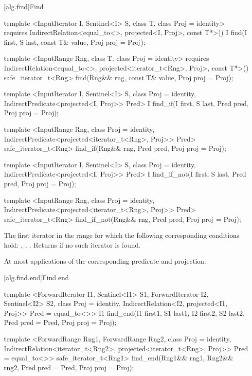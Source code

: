 [alg.find]{Find}

%
%
%
\begin{itemdecl}
template <InputIterator I, Sentinel<I> S, class T, class Proj = identity>
  requires IndirectRelation<equal_to<>, projected<I, Proj>, const T*>()
  I find(I first, S last, const T& value, Proj proj = Proj{});

template <InputRange Rng, class T, class Proj = identity>
  requires IndirectRelation<equal_to<>, projected<iterator_t<Rng>, Proj>, const T*>()
  safe_iterator_t<Rng>
    find(Rng&& rng, const T& value, Proj proj = Proj{});

template <InputIterator I, Sentinel<I> S, class Proj = identity,
    IndirectPredicate<projected<I, Proj>> Pred>
  I find_if(I first, S last, Pred pred, Proj proj = Proj{});

template <InputRange Rng, class Proj = identity,
    IndirectPredicate<projected<iterator_t<Rng>, Proj>> Pred>
  safe_iterator_t<Rng>
    find_if(Rng&& rng, Pred pred, Proj proj = Proj{});

template <InputIterator I, Sentinel<I> S, class Proj = identity,
    IndirectPredicate<projected<I, Proj>> Pred>
  I find_if_not(I first, S last, Pred pred, Proj proj = Proj{});

template <InputRange Rng, class Proj = identity,
    IndirectPredicate<projected<iterator_t<Rng>, Proj>> Pred>
  safe_iterator_t<Rng>
    find_if_not(Rng&& rng, Pred pred, Proj proj = Proj{});
\end{itemdecl}

\begin{itemdescr}
\pnum
\returns
The first iterator
in the range
for which the following corresponding
conditions hold:
,
,
.
Returns  if no such iterator is found.

\pnum
\complexity
At most
applications of the corresponding predicate and projection.
\end{itemdescr}

[alg.find.end]{Find end}

%
\begin{itemdecl}
template <ForwardIterator I1, Sentinel<I1> S1, ForwardIterator I2,
    Sentinel<I2> S2, class Proj = identity,
    IndirectRelation<I2, projected<I1, Proj>> Pred = equal_to<>>
  I1
    find_end(I1 first1, S1 last1, I2 first2, S2 last2,
             Pred pred = Pred{}, Proj proj = Proj{});

template <ForwardRange Rng1, ForwardRange Rng2,
    class Proj = identity,
    IndirectRelation<iterator_t<Rng2>,
      projected<iterator_t<Rng>, Proj>> Pred = equal_to<>>
  safe_iterator_t<Rng1>
    find_end(Rng1&& rng1, Rng2&& rng2, Pred pred = Pred{}, Proj proj = Proj{});
\end{itemdecl}

